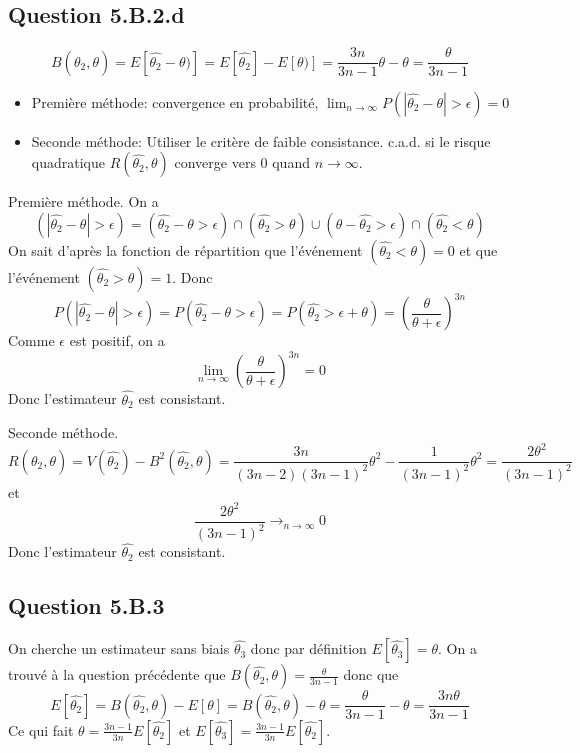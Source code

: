 \documentclass[]{book}
\theoremstyle{definition}
\begin{document}
\subsection*{Question 5.B.2.d}
$$
B(\hat{\theta_2},\theta) = E[\hat{\theta_2} - \theta)] = E[\hat{\theta_2}] - E[\theta)] = \frac{3n}{3n-1}\theta - \theta = \frac{\theta}{3n-1} 
$$

\begin{itemize}
    \item Premi\`ere m\'ethode: convergence en probabilit\'e, $\lim_{n \to \infty}P(|\hat{\theta_2}-\theta| > \epsilon) = 0$
    \item Seconde m\'ethode: Utiliser le crit\`ere de faible consistance. c.a.d. si le risque quadratique $R(\hat{\theta_2},\theta)$ converge vers 0 quand $n \to \infty$. 
\end{itemize}

Premi\`ere m\'ethode.
On a 
$$
(|\hat{\theta_2}-\theta|>\epsilon) = (\hat{\theta_2}-\theta > \epsilon ) \cap (\hat{\theta_2}>\theta) \cup (\theta - \hat{\theta_2} > \epsilon ) \cap (\hat{\theta_2} <\theta)
$$
On sait d'apr\`es la fonction de r\'epartition que l'\'ev\'enement $(\hat{\theta_2} <\theta) = 0$ et que l'\'ev\'enement $(\hat{\theta_2} > \theta) = 1$. Donc
$$
P(|\hat{\theta_2}-\theta| > \epsilon) = P(\hat{\theta_2}-\theta > \epsilon ) = P(\hat{\theta_2} > \epsilon +\theta) = \left(\frac{\theta}{\theta+\epsilon}\right)^{3n}
$$
Comme $\epsilon$ est positif, on a 
$$
\lim_{n \to \infty} \left(\frac{\theta}{\theta+\epsilon}\right)^{3n} = 0
$$
Donc l'estimateur $\hat{\theta_2}$ est consistant.



Seconde m\'ethode.
$$
R(\hat{\theta_2},\theta) = V(\hat{\theta_2}) - B^2(\hat{\theta_2},\theta) = \frac{3n}{(3n-2)(3n-1)^2}\theta^2 - \frac{1}{(3n-1)^2}\theta^2 = \frac{2\theta^2}{(3n-1)^2}
$$
et
$$
\frac{2\theta^2}{(3n-1)^2} \to_{n \to \infty} 0
$$
Donc l'estimateur $\hat{\theta_2}$ est consistant.

\subsection*{Question 5.B.3}
On cherche un estimateur sans biais $\hat{\theta_3}$ donc par d\'efinition $E[\hat{\theta_3}] = \theta$. On a trouv\'e \`a la question pr\'ec\'edente que $B(\hat{\theta_2},\theta) = \frac{\theta}{3n-1}$ donc que 
$$
E[\hat{\theta_2}] = B(\hat{\theta_2},\theta) - E[\theta] = B(\hat{\theta_2},\theta) - \theta = \frac{\theta}{3n-1} - \theta = \frac{3n\theta}{3n-1}
$$
Ce qui fait $\theta = \frac{3n-1}{3n}E[\hat{\theta_2}]$ et $E[\hat{\theta_3}] = \frac{3n-1}{3n}E[\hat{\theta_2}]$.
\end{document}
